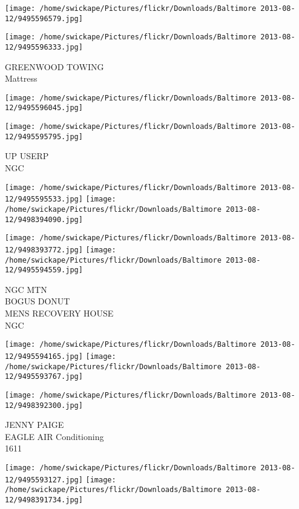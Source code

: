 \documentclass[10pt,letterpaper]{article}
\begin{document}
\texttt{[image: /home/swickape/Pictures/flickr/Downloads/Baltimore 2013-08-12/9495596579.jpg]}

\vspace{0.25in}
\texttt{[image: /home/swickape/Pictures/flickr/Downloads/Baltimore 2013-08-12/9495596333.jpg]}

GREENWOOD TOWING\\
Mattress\\
\pagebreak

\texttt{[image: /home/swickape/Pictures/flickr/Downloads/Baltimore 2013-08-12/9495596045.jpg]}

\vspace{0.25in}
\texttt{[image: /home/swickape/Pictures/flickr/Downloads/Baltimore 2013-08-12/9495595795.jpg]}

UP USERP\\
NGC\\
\pagebreak

\texttt{[image: /home/swickape/Pictures/flickr/Downloads/Baltimore 2013-08-12/9495595533.jpg]}
\texttt{[image: /home/swickape/Pictures/flickr/Downloads/Baltimore 2013-08-12/9498394090.jpg]}

\texttt{[image: /home/swickape/Pictures/flickr/Downloads/Baltimore 2013-08-12/9498393772.jpg]}
\texttt{[image: /home/swickape/Pictures/flickr/Downloads/Baltimore 2013-08-12/9495594559.jpg]}

NGC MTN\\
BOGUS DONUT\\
MENS RECOVERY HOUSE\\
NGC\\
\pagebreak

\texttt{[image: /home/swickape/Pictures/flickr/Downloads/Baltimore 2013-08-12/9495594165.jpg]}
\texttt{[image: /home/swickape/Pictures/flickr/Downloads/Baltimore 2013-08-12/9495593767.jpg]}

\vspace{0.25in}
\texttt{[image: /home/swickape/Pictures/flickr/Downloads/Baltimore 2013-08-12/9498392300.jpg]}

JENNY PAIGE\\
EAGLE AIR Conditioning\\
1611\\
\pagebreak

\texttt{[image: /home/swickape/Pictures/flickr/Downloads/Baltimore 2013-08-12/9495593127.jpg]}
\texttt{[image: /home/swickape/Pictures/flickr/Downloads/Baltimore 2013-08-12/9498391734.jpg]}
\end{document}
